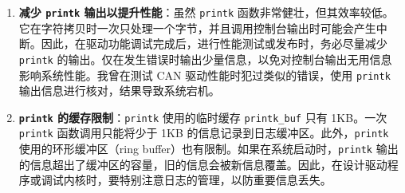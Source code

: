 \begin{enumerate}
\def\labelenumi{\arabic{enumi}.}
\item
  \textbf{减少 \texttt{printk} 输出以提升性能}：虽然 \texttt{printk} 函数非常健壮，但其效率较低。它在字符拷贝时一次只处理一个字节，并且调用控制台输出时可能会产生中断。因此，在驱动功能调试完成后，进行性能测试或发布时，务必尽量减少 \texttt{printk} 的输出。仅在发生错误时输出少量信息，以免对控制台输出无用信息影响系统性能。我曾在测试 CAN 驱动性能时犯过类似的错误，使用 \texttt{printk} 输出信息进行核对，结果导致系统宕机。
\item
  \textbf{\texttt{printk} 的缓存限制}：\texttt{printk} 使用的临时缓存 \texttt{printk\_buf} 只有 1KB。一次 \texttt{printk} 函数调用只能将少于 1KB 的信息记录到日志缓冲区。此外，\texttt{printk} 使用的环形缓冲区（ring buffer）也有限制。如果在系统启动时，\texttt{printk} 输出的信息超出了缓冲区的容量，旧的信息会被新信息覆盖。因此，在设计驱动程序或调试内核时，要特别注意日志的管理，以防重要信息丢失。
\end{enumerate}
